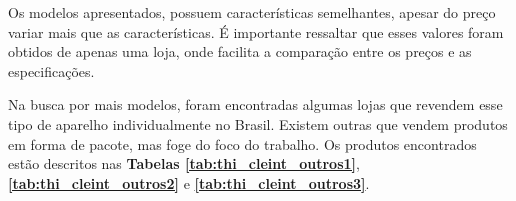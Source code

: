 \documentclass[
	12pt,				%
	openright,			%
	twoside,			%
	a4paper,			%
	chapter=TITLE,		%
	english,			%
	brazil				%
	]{abntex2}
\begin{document}
Os modelos apresentados, possuem características semelhantes, apesar do preço variar mais que as características. É importante ressaltar que esses valores foram obtidos de apenas uma loja, onde facilita a comparação entre os preços e as especificações.

Na busca por mais modelos, foram encontradas algumas lojas que revendem esse tipo de aparelho individualmente no Brasil. Existem outras que vendem produtos em forma de pacote, mas foge do foco do trabalho. Os produtos encontrados estão descritos nas \textbf{Tabelas \ref{tab:thi_cleint_outros1}}, \textbf{\ref{tab:thi_cleint_outros2}} e \textbf{\ref{tab:thi_cleint_outros3}}.

\begin{table}
\end{table}

\newpage



\end{document}
